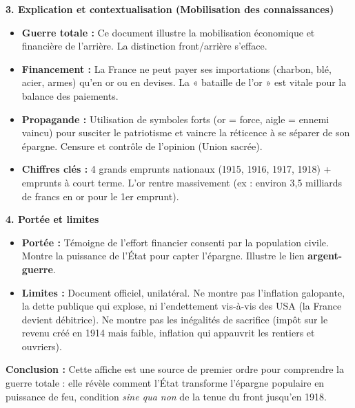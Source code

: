 \documentclass[11pt]{article}
\newcommand{\cle}[1]{{\popxbold\color{popdark}#1}}
\begin{document}
\begin{exoresolu}
\noindent \textbf{3. Explication et contextualisation (Mobilisation des connaissances)}
\begin{itemize}
\item \textbf{Guerre totale :} Ce document illustre la \cle{mobilisation économique et financière} de l'arrière. La distinction front/arrière s'efface.
\item \textbf{Financement :} La France ne peut payer ses importations (charbon, blé, acier, armes) qu'en or ou en devises. La « bataille de l'or » est vitale pour la balance des paiements.
\item \textbf{Propagande :} Utilisation de symboles forts (or = force, aigle = ennemi vaincu) pour susciter le patriotisme et vaincre la réticence à se séparer de son épargne. Censure et contrôle de l'opinion (Union sacrée).
\item \textbf{Chiffres clés :} 4 grands emprunts nationaux (1915, 1916, 1917, 1918) + emprunts à court terme. L'or rentre massivement (ex : environ 3,5 milliards de francs en or pour le 1er emprunt).
\end{itemize}

\noindent \textbf{4. Portée et limites}
\begin{itemize}
\item \textbf{Portée :} Témoigne de l'effort financier consenti par la population civile. Montre la puissance de l'État pour capter l'épargne. Illustre le lien \textbf{argent-guerre}.
\item \textbf{Limites :} Document officiel, unilatéral. Ne montre pas l'inflation galopante, la dette publique qui explose, ni l'endettement vis-à-vis des USA (la France devient débitrice). Ne montre pas les inégalités de sacrifice (impôt sur le revenu créé en 1914 mais faible, inflation qui appauvrit les rentiers et ouvriers).
\end{itemize}

\noindent \textbf{Conclusion :} Cette affiche est une source de premier ordre pour comprendre la \cle{guerre totale} : elle révèle comment l'État transforme l'épargne populaire en puissance de feu, condition \textit{sine qua non} de la tenue du front jusqu'en 1918.
\end{exoresolu}
\end{document}
